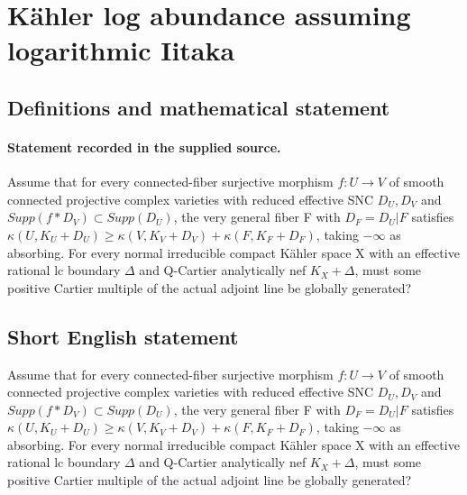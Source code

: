 \documentclass[11pt]{article}
\begin{document}
\section*{Kähler log abundance assuming logarithmic Iitaka}\label{30007023}
\subsection{Definitions and mathematical statement}
\paragraph{Statement recorded in the supplied source.}
Assume that for every connected-fiber surjective morphism $f:U\to V$ of smooth connected projective complex varieties with reduced effective SNC $D_U,D_V$ and $Supp(f*D_V)\subset Supp(D_U)$, the very general fiber F with $D_F=D_U|F$ satisfies $\kappa (U,K_U+D_U)\geq \kappa (V,K_V+D_V)+\kappa (F,K_F+D_F)$, taking $-\infty $ as absorbing. For every normal irreducible compact Kähler space X with an effective rational lc boundary $\Delta $ and Q-Cartier analytically nef $K_X+\Delta $, must some positive Cartier multiple of the actual adjoint line be globally generated?
\subsection{Short English statement}
Assume that for every connected-fiber surjective morphism $f:U\to V$ of smooth connected projective complex varieties with reduced effective SNC $D_U,D_V$ and $Supp(f*D_V)\subset Supp(D_U)$, the very general fiber F with $D_F=D_U|F$ satisfies $\kappa (U,K_U+D_U)\geq \kappa (V,K_V+D_V)+\kappa (F,K_F+D_F)$, taking $-\infty $ as absorbing. For every normal irreducible compact Kähler space X with an effective rational lc boundary $\Delta $ and Q-Cartier analytically nef $K_X+\Delta $, must some positive Cartier multiple of the actual adjoint line be globally generated?
\end{document}
